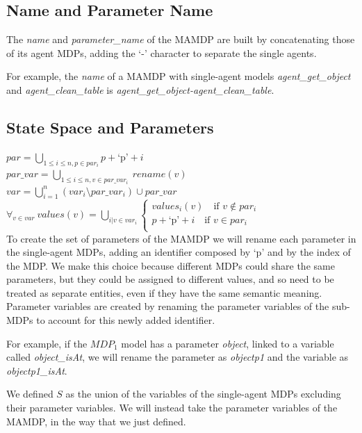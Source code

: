 \subsection{Name and Parameter Name}
The \textit{name} and \textit{parameter\_name} of the MAMDP are built by concatenating those of its agent MDPs, adding the `-' character to separate the single agents.

For example, the \textit{name} of a MAMDP with single-agent models \textit{agent\_get\_object} and  \textit{agent\_clean\_table} is \textit{agent\_get\_object-agent\_clean\_table}.

\subsection{State Space and Parameters}
$par=\bigcup_{1 \leq i \leq n, p \in par_i} p+\text{`p'}+i $ \\
$par\_var=\bigcup_{1 \leq i \leq n, v \in par\_var_i} \> rename(v)$ \\
$var=\bigcup_{i=1}^{n}(var_i \setminus par\_var_i) \cup par\_var$ \\
$\forall_{v \in var}\> values(v)=\bigcup_{i| v \in var_i} 
\begin{cases}
	 values_i(v) \quad \text{if } v \not \in par_i \\
	 p+\text{`p'}+i \quad \text{if } v \in par_i \\
\end{cases}$ \\ 

To create the set of parameters of the MAMDP we will rename each parameter in the single-agent MDPs, adding an identifier composed by `p' and by the index of the MDP. We make this choice because different MDPs could share the same parameters, but they could be assigned to different values, and so need to be treated as separate entities, even if they have the same semantic meaning. Parameter variables are created by renaming the parameter variables of the sub-MDPs to account for this newly added identifier.

For example, if the $MDP_1$ model has a parameter \textit{object}, linked to a variable called \textit{object\_isAt}, we will rename the parameter as \textit{objectp1} and the variable as \textit{objectp1\_isAt}. 

We defined $S$ as the union of the variables of the single-agent MDPs excluding their parameter variables. We will instead take the parameter variables of the MAMDP, in the way that we just defined.

